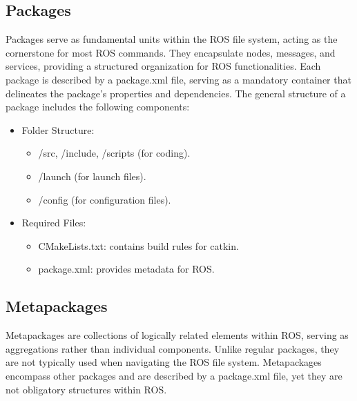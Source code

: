 \subsection{Packages}
Packages serve as fundamental units within the ROS file system, acting as the cornerstone for most ROS commands. 
They encapsulate nodes, messages, and services, providing a structured organization for ROS functionalities.
Each package is described by a package.xml file, serving as a mandatory container that delineates the package's properties and dependencies.
The general structure of a package includes the following components:
\begin{itemize}
    \item Folder Structure:
        \begin{itemize}
            \item /src, /include, /scripts (for coding).
            \item /launch (for launch files).
            \item /config (for configuration files).
        \end{itemize}
    \item Required Files:
        \begin{itemize}
            \item CMakeLists.txt: contains build rules for catkin.
            \item package.xml: provides metadata for ROS.
        \end{itemize}
\end{itemize}

\subsection{Metapackages}
Metapackages are collections of logically related elements within ROS, serving as aggregations rather than individual components. 
Unlike regular packages, they are not typically used when navigating the ROS file system. 
Metapackages encompass other packages and are described by a package.xml file, yet they are not obligatory structures within ROS.